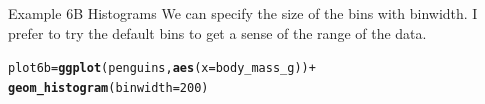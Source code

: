 \documentclass{beamer}\usepackage[]{graphicx}\usepackage[]{xcolor}
\makeatletter
\newcommand{\hlnum}[1]{\textcolor[rgb]{0.686,0.059,0.569}{#1}}%
\newcommand{\hlopt}[1]{\textcolor[rgb]{0,0,0}{#1}}%
\newcommand{\hlstd}[1]{\textcolor[rgb]{0.345,0.345,0.345}{#1}}%
\newcommand{\hlkwb}[1]{\textcolor[rgb]{0.69,0.353,0.396}{#1}}%
\newcommand{\hlkwc}[1]{\textcolor[rgb]{0.333,0.667,0.333}{#1}}%
\newcommand{\hlkwd}[1]{\textcolor[rgb]{0.737,0.353,0.396}{\textbf{#1}}}%
\newenvironment{kframe}{%
 \def\at@end@of@kframe{}%
 \ifinner\ifhmode%
  \def\at@end@of@kframe{\end{minipage}}%
  \begin{minipage}{\columnwidth}%
 \fi\fi%
 \def\FrameCommand##1{\hskip\@totalleftmargin \hskip-\fboxsep
 \colorbox{shadecolor}{##1}\hskip-\fboxsep
     \hskip-\linewidth \hskip-\@totalleftmargin \hskip\columnwidth}%
 \MakeFramed {\advance\hsize-\width
   \@totalleftmargin\z@ \linewidth\hsize
   \@setminipage}}%
 {\par\unskip\endMakeFramed%
 \at@end@of@kframe}
\newenvironment{knitrout}{}{} %
\makeatother
\begin{document}
\begin{frame}[fragile]{Example 6B Histograms}
We can specify the size of the bins with binwidth. I prefer to try the default bins to get a sense of the range of the data.
\begin{knitrout}
\color{fgcolor}\begin{kframe}
\begin{alltt}
\hlstd{plot6b} \hlkwb{=} \hlkwd{ggplot}\hlstd{(penguins,} \hlkwd{aes}\hlstd{(}\hlkwc{x} \hlstd{= body_mass_g))} \hlopt{+}
    \hlkwd{geom_histogram}\hlstd{(}\hlkwc{binwidth} \hlstd{=} \hlnum{200}\hlstd{)}
\end{alltt}
\end{kframe}
\end{knitrout}


\end{frame}
\end{document}
